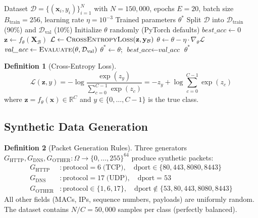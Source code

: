 \documentclass[11pt,a4paper,twoside]{article}
\theoremstyle{definition}
\newtheorem{definition}{Definition}[section]
\theoremstyle{remark}
\newcommand{\R}{\mathbb{R}}
\newcommand{\mat}[1]{\mathbf{#1}}
\newcommand{\vect}[1]{\mathbf{#1}}
\begin{document}
\begin{algorithm}[H]
\caption{\textsc{TrainClassifier}: SGD training with cross-entropy loss}
\label{alg:train}
\begin{algorithmic}[1]
\Require Dataset $\mathcal{D} = \{(\vect{x}_i, y_i)\}_{i=1}^{N}$ with $N = 150{,}000$, epochs $E = 20$, batch size $B_{\text{train}} = 256$, learning rate $\eta = 10^{-3}$
\Ensure Trained parameters $\theta^*$
\State Split $\mathcal{D}$ into $\mathcal{D}_{\text{train}}$ (90\%) and $\mathcal{D}_{\text{val}}$ (10\%)
\State Initialize $\theta$ randomly (PyTorch defaults)
\State $\textit{best\_acc} \gets 0$
    \State $\vect{z} \gets f_\theta(\mat{X}_{\mathcal{B}})$ 
    \State $\mathcal{L} \gets \textsc{CrossEntropyLoss}(\vect{z}, \vect{y}_{\mathcal{B}})$ 
    \State $\theta \gets \theta - \eta \cdot \nabla_\theta \mathcal{L}$ 
  \EndFor
  \State $\textit{val\_acc} \gets \textsc{Evaluate}(\theta, \mathcal{D}_{\text{val}})$
    \State $\theta^* \gets \theta$; \quad $\textit{best\_acc} \gets \textit{val\_acc}$
  \EndIf
\EndFor
\State \Return $\theta^*$ 
\end{algorithmic}
\end{algorithm}

\begin{definition}[Cross-Entropy Loss]
\label{def:celoss}
\begin{equation}
\mathcal{L}(\vect{z}, y) = -\log\frac{\exp(z_y)}{\sum_{c=0}^{C-1} \exp(z_c)} = -z_y + \log \sum_{c=0}^{C-1} \exp(z_c)
\label{eq:celoss}
\end{equation}
where $\vect{z} = f_\theta(\vect{x}) \in \R^C$ and $y \in \{0, \ldots, C-1\}$ is the true class.
\end{definition}

\subsection{Synthetic Data Generation}

\begin{definition}[Packet Generation Rules]
\label{def:packet-gen}
Three generators $G_{\text{HTTP}}, G_{\text{DNS}}, G_{\text{OTHER}}: \Omega \to \{0,\ldots,255\}^{64}$ produce synthetic packets:
\begin{align}
G_{\text{HTTP}} &: \text{protocol} = 6\;\text{(TCP)}, \quad \text{dport} \in \{80, 443, 8080, 8443\} \\
G_{\text{DNS}} &: \text{protocol} = 17\;\text{(UDP)}, \quad \text{dport} = 53 \\
G_{\text{OTHER}} &: \text{protocol} \in \{1, 6, 17\}, \quad \text{dport} \notin \{53, 80, 443, 8080, 8443\}
\end{align}
All other fields (MACs, IPs, sequence numbers, payloads) are uniformly random.
The dataset contains $N/C = 50{,}000$ samples per class (perfectly balanced).
\end{definition}
\end{document}
